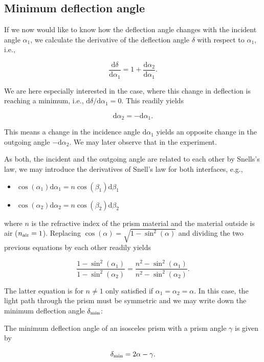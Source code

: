 \documentclass[
  a4paper,
]{book}
\providecommand{\tightlist}{%
  \setlength{\itemsep}{0pt}\setlength{\parskip}{0pt}}
\begin{document}
\subsection{Minimum deflection angle}\label{minimum-deflection-angle}

If we now would like to know how the deflection angle changes with the
incident angle \(\alpha_1\), we calculate the derivative of the
deflection angle \(\delta\) with respect to \(\alpha_1\), i.e.,

\[\frac{\mathrm d\delta}{\mathrm d\alpha_1}=1+\frac{\mathrm d\alpha_2}{\mathrm d \alpha_1}.\]

We are here especially interested in the case, where this change in
deflection is reaching a minimum, i.e.,
\(\mathrm d\delta/\mathrm d\alpha_1 =0\). This readily yields

\[\mathrm d \alpha_2=-\mathrm d\alpha_1.\]

This means a change in the incidence angle \(\mathrm d\alpha_1\) yields
an opposite change in the outgoing angle \(-\mathrm d\alpha_2\). We may
later observe that in the experiment.

As both, the incident and the outgoing angle are related to each other
by Snells's law, we may introduce the derivatives of Snell's law for
both interfaces, e.g.,

\begin{itemize}
\tightlist
\item
  \(\cos(\alpha_1)\mathrm d\alpha_1=n\cos(\beta_1)\mathrm d\beta_1\)
\item
  \(\cos(\alpha_2)\mathrm d\alpha_2=n\cos(\beta_2)\mathrm d\beta_2\)
\end{itemize}

where \(n\) is the refractive index of the prism material and the
material outside is air (\(n_{\rm air}=1\)). Replacing
\(\cos(\alpha)=\sqrt{1-\sin^2(\alpha)}\) and dividing the two previous
equations by each other readily yields

\[\frac{1-\sin^2(\alpha_1)}{1-\sin^2(\alpha_2)}=\frac{n^2-\sin^2(\alpha_1)}{n^2-\sin^2(\alpha_2)}.\]

The latter equation is for \(n\neq 1\) only satisfied if
\(\alpha_1=\alpha_2=\alpha\). In this case, the light path through the
prism must be symmetric and we may write down the minimum deflection
angle \(\delta_{\rm min}\):

\begin{tcolorbox}[enhanced jigsaw, breakable, toptitle=1mm, bottomrule=.15mm, colbacktitle=quarto-callout-note-color!10!white, title=\textcolor{quarto-callout-note-color}{\faInfo}\hspace{0.5em}{Minimum prism deflection}, arc=.35mm, rightrule=.15mm, bottomtitle=1mm, opacityback=0, toprule=.15mm, coltitle=black, leftrule=.75mm, opacitybacktitle=0.6, colback=white, left=2mm, titlerule=0mm, colframe=quarto-callout-note-color-frame]

The minimum deflection angle of an isosceles prism with a prism angle
\(\gamma\) is given by

\[\delta_{\rm min}=2\alpha-\gamma.\]

\end{tcolorbox}
\end{document}
